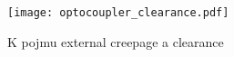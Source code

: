         \begin{figure}[hb!]
          \centering
          \texttt{[image: optocoupler\_clearance.pdf]}
          \caption{K pojmu external creepage a clearance}
          \label{es:fig_optocoupler_clearance}
        \end{figure}

